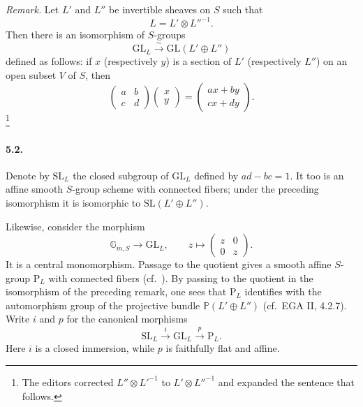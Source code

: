 \smallskip
\noindent\textit{Remark.}
Let \(L'\) and \(L''\) be invertible sheaves on \(S\) such that
\[
 L=L'\otimes L''^{-1}.
\]
Then there is an isomorphism of \(S\)-groups
\[
 \mathrm{GL}_L\xrightarrow{\ \sim\ }\mathrm{GL}(L'\oplus L'')
\]
defined as follows: if \(x\) (respectively \(y\)) is a section of
\(L'\) (respectively \(L''\)) on an open subset \(V\) of \(S\), then
\[
 \begin{pmatrix}a&b\\c&d\end{pmatrix}
 \begin{pmatrix}x\\y\end{pmatrix}
 =
 \begin{pmatrix}ax+by\\cx+dy\end{pmatrix}.
\]
\footnote{The editors corrected
\(L''\otimes L'^{-1}\) to \(L'\otimes L''^{-1}\) and expanded the
sentence that follows.}

\paragraph{\textbf{5.2.}}
Denote by \(\mathrm{SL}_L\) the closed subgroup of
\(\mathrm{GL}_L\) defined by \(ad-bc=1\).  It too is an affine smooth
\(S\)-group scheme with connected fibers; under the preceding
isomorphism it is isomorphic to \(\mathrm{SL}(L'\oplus L'')\).

Likewise, consider the morphism
\[
 \mathbb G_{m,S}\longrightarrow\mathrm{GL}_L,
 \qquad
 z\longmapsto\begin{pmatrix}z&0\\0&z\end{pmatrix}.
\]
It is a central monomorphism.  Passage to the quotient gives a smooth
affine \(S\)-group \(\mathrm P_L\) with connected fibers
\textup{(cf.\ )}.  By passing to the quotient in the
isomorphism of the preceding remark, one sees that \(\mathrm P_L\)
identifies with the automorphism group of the projective bundle
\(\mathbb P(L'\oplus L'')\) \textup{(cf.\ EGA II, 4.2.7)}.
Write \(i\) and \(p\) for the canonical morphisms
\[
 \mathrm{SL}_L\xrightarrow{\ i\ }\mathrm{GL}_L
   \xrightarrow{\ p\ }\mathrm P_L.
\]
Here \(i\) is a closed immersion, while \(p\) is faithfully flat and
affine.

